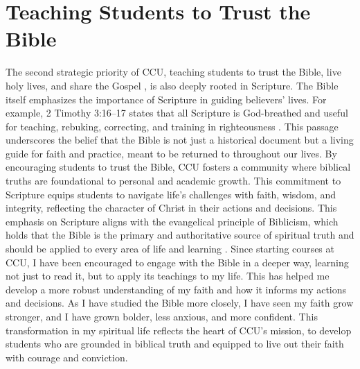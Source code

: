 \documentclass[stu,12pt,floatsintext]{apa7}
\begin{document}
\section{Teaching Students to Trust the Bible}
The second strategic priority of CCU, teaching students to trust the Bible, live holy lives, and share the Gospel \parencite{coloradochristianuniversityStrategicPriorities}, is also deeply rooted in Scripture. The Bible itself emphasizes the importance of Scripture in guiding believers' lives. For example, 2 Timothy 3:16–17 states that all Scripture is God-breathed and useful for teaching, rebuking, correcting, and training in righteousness \parencite{Tyndale1996}. This passage underscores the belief that the Bible is not just a historical document but a living guide for faith and practice, meant to be returned to throughout our lives. By encouraging students to trust the Bible, CCU fosters a community where biblical truths are foundational to personal and academic growth. This commitment to Scripture equips students to navigate life's challenges with faith, wisdom, and integrity, reflecting the character of Christ in their actions and decisions. This emphasis on Scripture aligns with the evangelical principle of Biblicism, which holds that the Bible is the primary and authoritative source of spiritual truth and should be applied to every area of life and learning \parencite{FaustSilvaSession2}.
Since starting courses at CCU, I have been encouraged to engage with the Bible in a deeper way, learning not just to read it, but to apply its teachings to my life. This has helped me develop a more robust understanding of my faith and how it informs my actions and decisions. As I have studied the Bible more closely, I have seen my faith grow stronger, and I have grown bolder, less anxious, and more confident. This transformation in my spiritual life reflects the heart of CCU’s mission, to develop students who are grounded in biblical truth and equipped to live out their faith with courage and conviction.
\end{document}

